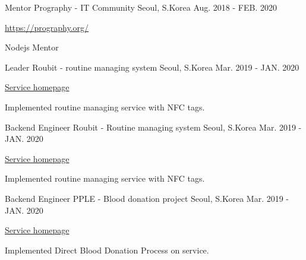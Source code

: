 

\begin{cventries}
  \cventry
    {Mentor} %
    {Prography - IT Community} %
    {Seoul, S.Korea} %
    {Aug. 2018 - FEB. 2020} %
    {
      \begin{cvitems} %
        \item {\href{https://prography.org/}{https://prography.org/}}
        \item {Nodejs Mentor}
      \end{cvitems}
    }
    
  \cventry
    {Leader} %
    {Roubit - routine managing system} %
    {Seoul, S.Korea} %
    {Mar. 2019 - JAN. 2020} %
    {
      \begin{cvitems} %
        \item {\href{https://roubit.me/}{Service homepage}}
        \item {Implemented routine managing service with NFC tags.}
      \end{cvitems}
    }

  \cventry
    {Backend Engineer} %
    {Roubit - Routine managing system} %
    {Seoul, S.Korea} %
    {Mar. 2019 - JAN. 2020} %
    {
      \begin{cvitems} %
        \item {\href{https://roubit.me/}{Service homepage}}
        \item {Implemented routine managing service with NFC tags.}
      \end{cvitems}
    }

  \cventry
    {Backend Engineer} %
    {PPLE - Blood donation project} %
    {Seoul, S.Korea} %
    {Mar. 2019 - JAN. 2020} %
    {
      \begin{cvitems} %
        \item {\href{https://pple.link/}{Service homepage}}
        \item {Implemented Direct Blood Donation Process on service.}
      \end{cvitems}
    }

\end{cventries}
